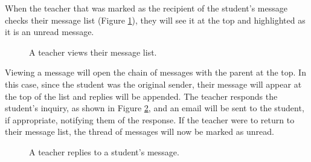 When the teacher that was marked as the recipient of the student's message checks their message list (Figure \ref{fig:screens-message-list}), they will see it at the top and highlighted as it is an unread message.

\begin{figure}[h!]
	\centering
	\caption{A teacher views their message list.}
	\label{fig:screens-message-list}
\end{figure}

Viewing a message will open the chain of messages with the parent at the top. In this case, since the student was the original sender, their message will appear at the top of the list and replies will be appended. The teacher responds the student's inquiry, as shown in Figure \ref{fig:screens-message-reply}, and an email will be sent to the student, if appropriate, notifying them of the response. If the teacher were to return to their message list, the thread of messages will now be marked as unread.

\begin{figure}[h!]
	\centering
	\caption{A teacher replies to a student's message.}
	\label{fig:screens-message-reply}
\end{figure}

